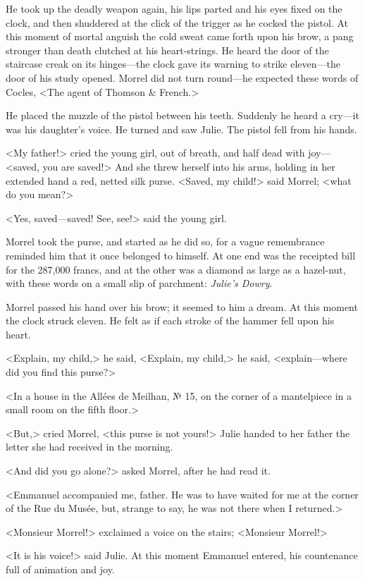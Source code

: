 He took up the deadly weapon again, his lips parted and his eyes fixed on the clock, and then shuddered at the click of the trigger as he cocked the pistol. At this moment of mortal anguish the cold sweat came forth upon his brow, a pang stronger than death clutched at his heart-strings. He heard the door of the staircase creak on its hinges—the clock gave its warning to strike eleven—the door of his study opened. Morrel did not turn round—he expected these words of Cocles, <The agent of Thomson \& French.> 

 He placed the muzzle of the pistol between his teeth. Suddenly he heard a cry—it was his daughter's voice. He turned and saw Julie. The pistol fell from his hands. 

 <My father!> cried the young girl, out of breath, and half dead with joy—<saved, you are saved!> And she threw herself into his arms, holding in her extended hand a red, netted silk purse.  <Saved, my child!> said Morrel; <what do you mean?> 

 <Yes, saved—saved! See, see!> said the young girl. 

 Morrel took the purse, and started as he did so, for a vague remembrance reminded him that it once belonged to himself. At one end was the receipted bill for the 287,000 francs, and at the other was a diamond as large as a hazel-nut, with these words on a small slip of parchment: \textit{Julie's Dowry}. 

 Morrel passed his hand over his brow; it seemed to him a dream. At this moment the clock struck eleven. He felt as if each stroke of the hammer fell upon his heart. 

 <Explain, my child,> he said, <Explain, my child,> he said, <explain—where did you find this purse?> 

 <In a house in the Allées de Meilhan, № 15, on the corner of a mantelpiece in a small room on the fifth floor.> 

 <But,> cried Morrel, <this purse is not yours!> Julie handed to her father the letter she had received in the morning. 

 <And did you go alone?> asked Morrel, after he had read it. 

 <Emmanuel accompanied me, father. He was to have waited for me at the corner of the Rue du Musée, but, strange to say, he was not there when I returned.> 

 <Monsieur Morrel!> exclaimed a voice on the stairs; <Monsieur Morrel!> 

 <It is his voice!> said Julie. At this moment Emmanuel entered, his countenance full of animation and joy. 

